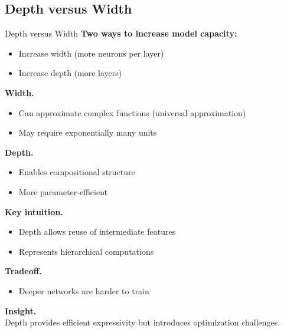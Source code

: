 \documentclass[aspectratio=169,11pt]{beamer}
\begin{document}
\subsection{Depth versus Width}
\begin{frame}[t,allowframebreaks]{Depth versus Width}
\small
\textbf{Two ways to increase model capacity:}\\ \begin{itemize}
    \item Increase width (more neurons per layer)
    \item Increase depth (more layers)
\end{itemize}

\textbf{Width.}\\ \begin{itemize}
    \item Can approximate complex functions (universal approximation)
    \item May require exponentially many units
\end{itemize}

\textbf{Depth.}\\ \begin{itemize}
    \item Enables compositional structure
    \item More parameter-efficient
\end{itemize}

\textbf{Key intuition.}\\ \begin{itemize}
    \item Depth allows reuse of intermediate features
    \item Represents hierarchical computations
\end{itemize}

\textbf{Tradeoff.}\\ \begin{itemize}
    \item Deeper networks are harder to train
\end{itemize}

\textbf{Insight.}\\ Depth provides efficient expressivity but introduces optimization challenges.
\end{frame}
\end{document}

